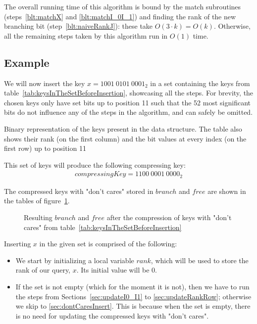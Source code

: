 The overall running time of this algorithm is bound by the match subroutines (steps~\ref{blt:matchX} and \ref{blt:matchI_0I_1}) and finding the rank of the new branching bit (step~\ref{blt:naiveRankJ}): these take $O(3\cdot k) = O(k)$. Otherwise, all the remaining steps taken by this algorithm run in $O(1)$ time.

\subsection{Example} \label{sec:dontCaresInsertExample}

We will now insert the key $x = 1001\ 0101\ 0001_2$ in a set containing the keys from table~\ref{tab:keysInTheSetBeforeInsertion}, showcasing all the steps. For brevity, the chosen keys only have set bits up to position 11 such that the 52 most significant bits do not influence any of the steps in the algorithm, and can safely be omitted.

\begin{table}[H]
\centering

\caption[Example set of keys in binary]{Binary representation of the keys present in the data structure. The table also shows their rank (on the first column) and the bit values at every index (on the first row) up to position 11}
\label{tab:keysInTheSetBeforeInsertion}
\end{table}

This set of keys will produce the following compressing key:
\begin{align*}
    compressingKey = 1100\ 0001\ 0000_2
\end{align*}

The compressed keys with "don't cares" stored in $branch$ and $free$ are shown in the tables of figure~\ref{fig:branchAndFreeBeforeInsertion}.

\begin{figure}[H]
\centering

\caption{Resulting $branch$ and $free$ after the compression of keys with "don't cares" from table~\ref{tab:keysInTheSetBeforeInsertion}}
\label{fig:branchAndFreeBeforeInsertion}
\end{figure}

Inserting $x$ in the given set is comprised of the following:

\begin{itemize}
    \item
    We start by initializing a local variable $rank$, which will be used to store the rank of our query, $x$. Its initial value will be $0$.
    
    \item
    If the set is not empty (which for the moment it is not), then we have to run the steps from Sections~\ref{sec:updateI0_I1} to \ref{sec:updateRankRow}; otherwise we skip to \ref{sec:dontCaresInsert}. This is because when the set is empty, there is no need for updating the compressed keys with "don't cares".
\end{itemize}


